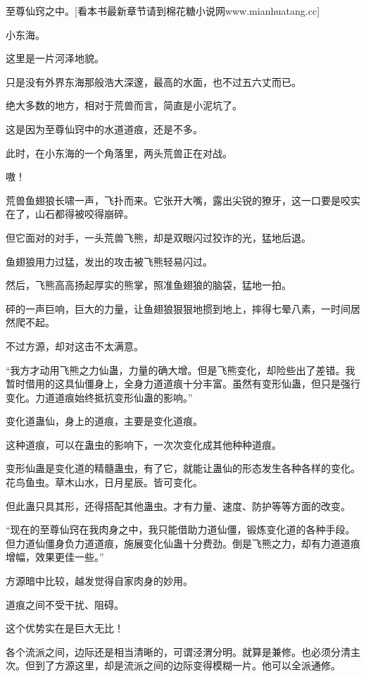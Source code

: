 
\begin{this_body}

至尊仙窍之中。[看本书最新章节请到棉花糖小说网www.mianhuatang.cc]

小东海。

这里是一片河泽地貌。

只是没有外界东海那般浩大深邃，最高的水面，也不过五六丈而已。

绝大多数的地方，相对于荒兽而言，简直是小泥坑了。

这是因为至尊仙窍中的水道道痕，还是不多。

此时，在小东海的一个角落里，两头荒兽正在对战。

嗷！

荒兽鱼翅狼长啸一声，飞扑而来。它张开大嘴，露出尖锐的獠牙，这一口要是咬实在了，山石都得被咬得崩碎。

但它面对的对手，一头荒兽飞熊，却是双眼闪过狡诈的光，猛地后退。

鱼翅狼用力过猛，发出的攻击被飞熊轻易闪过。

然后，飞熊高高扬起厚实的熊掌，照准鱼翅狼的脑袋，猛地一拍。

砰的一声巨响，巨大的力量，让鱼翅狼狠狠地掼到地上，摔得七晕八素，一时间居然爬不起。

不过方源，却对这击不太满意。

“我方才动用飞熊之力仙蛊，力量的确大增。但是飞熊变化，却险些出了差错。我暂时借用的这具仙僵身上，全身力道道痕十分丰富。虽然有变形仙蛊，但只是强行变化。力道道痕始终抵抗变形仙蛊的影响。”

变化道蛊仙，身上的道痕，主要是变化道痕。

这种道痕，可以在蛊虫的影响下，一次次变化成其他种种道痕。

变形仙蛊是变化道的精髓蛊虫，有了它，就能让蛊仙的形态发生各种各样的变化。花鸟鱼虫。草木山水，日月星辰。皆可变化。

但此蛊只具其形，还得搭配其他蛊虫。才有力量、速度、防护等等方面的改变。

“现在的至尊仙窍在我肉身之中，我只能借助力道仙僵，锻炼变化道的各种手段。但力道仙僵身负力道道痕，施展变化仙蛊十分费劲。倒是飞熊之力，却有力道道痕增幅，效果更佳一些。”

方源暗中比较，越发觉得自家肉身的妙用。

道痕之间不受干扰、阻碍。

这个优势实在是巨大无比！

各个流派之间，边际还是相当清晰的，可谓泾渭分明。就算是兼修。也必须分清主次。但到了方源这里，却是流派之间的边际变得模糊一片。他可以全派通修。


\end{this_body}
